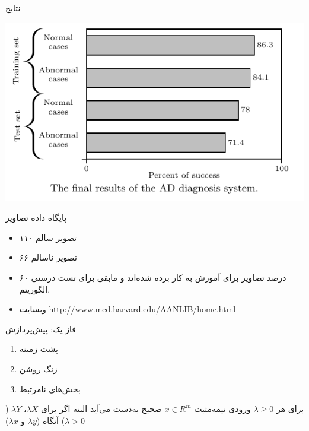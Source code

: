 \documentclass[debug,a0paper,portrait]{xebaposter}
\begin{document}
\begin{poster}
\begin{posterbox}[name=results,column=1,span=2,below=phase2]{نتایج}
\begin{multicols}{2}
    \centerline{\includegraphics[scale=.7]{fig5}}
\end{multicols}
\end{posterbox}
\begin{posterbox}[name=imagedataset,column=0,span=1,below=introduction]{پایگاه داده تصاویر}
\begin{itemize}
	\item ۱۱۰ تصویر سالم
	\item ۶۶ تصویر ناسالم
	\item ۶۰ درصد تصاویر برای آموزش به کار برده شده‌اند و مابقی برای تست درستی الگوریتم.
	\item وبسایت \url{http://www.med.harvard.edu/AANLIB/home.html}
\end{itemize}
\end{posterbox}
\begin{posterbox}[name=phase1,column=0,span=1,below=imagedataset]{فاز یک{:} پیش‌پردازش}
\ptext[12]
\begin{enumerate}
	\item پشت زمینه
	\item زنگ روشن
	\item بخش‌های نامرتبط
\end{enumerate}
\ptext[14]

برای هر $\lambda \geq 0$ ورودی نیمه‌مثبت $x\in R^m$ صحیح به‌دست می‌آید البته اگر برای $\lambda X$، $\lambda Y$ ($\lambda >0$) آنگاه ($\lambda y$ و $\lambda x$)


\end{posterbox}
\end{poster}
\end{document}
